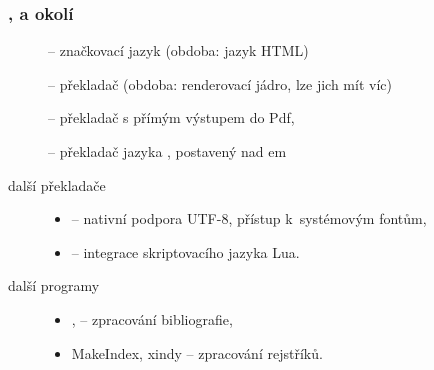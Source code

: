\begin{frame}
	\frametitle{,  a okolí}
	\begin{description}
		\item[] -- značkovací jazyk (obdoba: jazyk HTML)
		\item[] -- překladač (obdoba: renderovací jádro, lze jich mít víc)
		\item[] -- překladač s přímým výstupem do Pdf,
		\item[] -- překladač jazyka , postavený nad em
		\item[další překladače]\mbox{}
			\begin{itemize}
				\item {} -- nativní podpora UTF-8, přístup k~systémovým fontům,
				\item {} -- integrace skriptovacího jazyka Lua.
			\end{itemize}
		\item[další programy]\mbox{}
			\begin{itemize}
				\item {},  -- zpracování bibliografie,
				\item MakeIndex, xindy -- zpracování rejstříků.
			\end{itemize}
	\end{description}
\end{frame}


